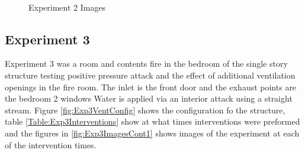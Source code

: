\documentclass{article}
\begin{document}
\begin{figure}[H]
	\ContinuedFloat 
	\centering 
	 \ 
	 \ 
	 \ 
	\caption{Experiment 2 Images}
	\label{fig:Experiment2ImagesCont3} 
\end{figure}

\subsection{Experiment 3}
Experiment 3 was a room and contents fire in the bedroom of the single story structure testing positive pressure attack and the effect of additional ventilation openings in the fire room. The inlet is the front door and the exhaust points are the bedroom 2 windows Water is applied via an interior attack using a straight stream. Figure \ref{fig:Exp3VentConfig} shows the configuration fo the structure, table \ref{Table:Exp3Interventions} show at what times interventions were preformed and the figures in \ref{fig:Exp3ImagesCont1} shows images of the experiment at each of the intervention times.
\end{document}
